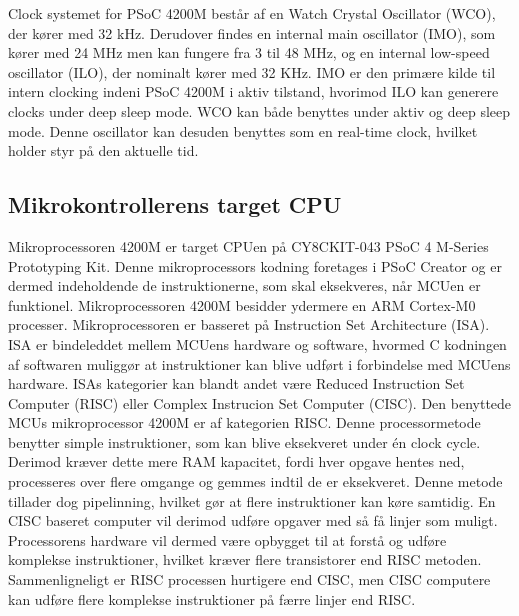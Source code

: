 Clock systemet for PSoC 4200M består af en Watch Crystal Oscillator (WCO), der kører med 32 kHz. Derudover findes en internal main oscillator (IMO), som kører med 24 MHz men kan fungere fra 3 til 48 MHz, og en internal low-speed oscillator (ILO), der nominalt kører med 32 KHz. IMO er den primære kilde til intern clocking indeni PSoC 4200M i aktiv tilstand, hvorimod ILO kan generere clocks under deep sleep mode. WCO kan både benyttes under aktiv og deep sleep mode. Denne oscillator kan desuden benyttes som en real-time clock, hvilket holder styr på den aktuelle tid. \citep{Semiconductor20164200M}

\subsection{Mikrokontrollerens target CPU}
Mikroprocessoren 4200M er target CPUen på CY8CKIT-043 PSoC 4 M-Series Prototyping Kit. Denne mikroprocessors kodning foretages i PSoC Creator og er dermed indeholdende de instruktionerne, som skal eksekveres, når MCUen er funktionel. Mikroprocessoren 4200M besidder ydermere en ARM Cortex-M0 processer. \newline
Mikroprocessoren er basseret på Instruction Set Architecture (ISA). ISA er bindeleddet mellem MCUens hardware og software, hvormed C kodningen af softwaren muliggør at instruktioner kan blive udført i forbindelse med MCUens hardware. ISAs kategorier kan blandt andet være Reduced Instruction Set Computer (RISC) eller Complex Instrucion Set Computer (CISC). \citep{CYPRESS2016Cortexm0,Semiconductor20164200M,Yadav2016} \newline
Den benyttede MCUs mikroprocessor 4200M er af kategorien RISC. Denne processormetode benytter simple instruktioner, som kan blive eksekveret under én clock cycle. Derimod kræver dette mere RAM kapacitet, fordi hver opgave hentes ned, processeres over flere omgange og gemmes indtil de er eksekveret. Denne metode tillader dog pipelinning, hvilket gør at flere instruktioner kan køre samtidig. En CISC baseret computer vil derimod udføre opgaver med så få linjer som muligt. Processorens hardware vil dermed være opbygget til at forstå og udføre komplekse instruktioner, hvilket kræver flere transistorer end RISC metoden.  Sammenligneligt er RISC processen hurtigere end CISC, men CISC computere kan udføre flere komplekse instruktioner på færre linjer end RISC. \citep{CYPRESS2016Cortexm0,Semiconductor20164200M,Yadav2016}\\
